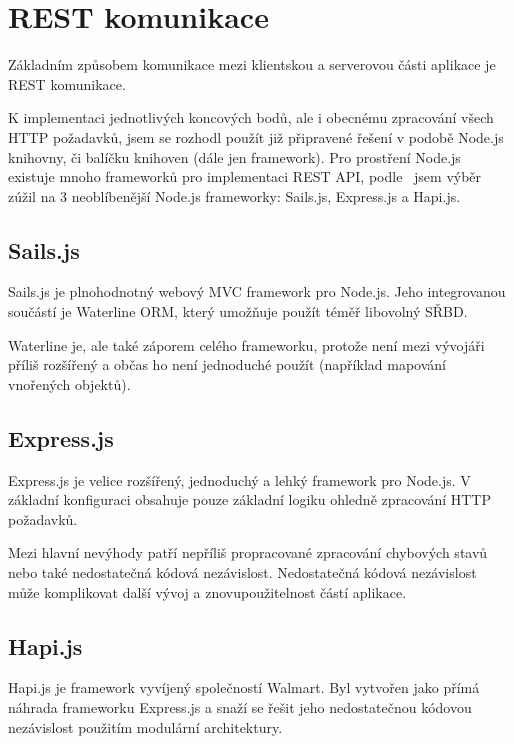 
\section{REST komunikace}\label{sec:restKomunikace}

Základním způsobem komunikace mezi klientskou a serverovou části aplikace je \gls{REST} komunikace.

K implementaci jednotlivých koncových bodů, ale i obecnému zpracování všech \gls{HTTP} požadavků, jsem se rozhodl použít již připravené řešení v podobě Node.js knihovny, či balíčku knihoven (dále jen framework).
Pro prostření Node.js existuje mnoho frameworků pro implementaci \gls{REST} \gls{API}, podle~\cite{node:framework} jsem výběr zúžil na 3 neoblíbenější Node.js frameworky: Sails.js, Express.js a Hapi.js.

\subsection{Sails.js}\label{subsec:sails.js}

Sails.js je plnohodnotný webový \gls{MVC} framework pro Node.js.
Jeho integrovanou součástí je Waterline \gls{ORM}, který umožňuje použít téměř libovolný \gls{SŘBD}.

Waterline je, ale také záporem celého frameworku, protože není mezi vývojáři příliš rozšířený a občas ho není jednoduché použít (například mapování vnořených objektů).

\subsection{Express.js}\label{subsec:express.js}

Express.js je velice rozšířený, jednoduchý a lehký framework pro Node.js.
V základní konfiguraci obsahuje pouze základní logiku ohledně zpracování \gls{HTTP} požadavků.

Mezi hlavní nevýhody patří nepříliš propracované zpracování chybových stavů nebo také nedostatečná kódová nezávislost.
Nedostatečná kódová nezávislost může komplikovat další vývoj a znovupoužitelnost částí aplikace.

\subsection{Hapi.js}\label{subsec:hapi.js}

Hapi.js je framework vyvíjený společností Walmart.
Byl vytvořen jako přímá náhrada frameworku Express.js a snaží se řešit jeho nedostatečnou kódovou nezávislost použitím modulární architektury.

